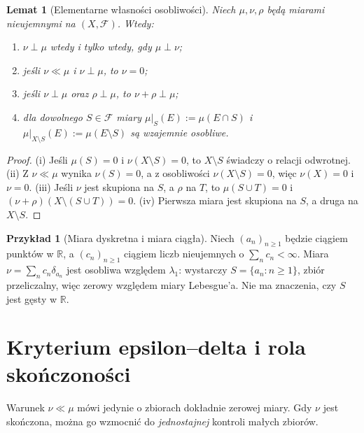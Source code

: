 \documentclass[11pt,a4paper,oneside]{book}
\numberwithin{equation}{chapter}
\theoremstyle{plain}
\newtheorem{lemat}[twierdzenie]{Lemat}
\theoremstyle{definition}
\newtheorem{przyklad}[twierdzenie]{Przykład}
\theoremstyle{remark}
\begin{document}
\begin{lemat}[Elementarne własności osobliwości]
\label{lem:singularity-17}
Niech $\mu,\nu,\rho$ będą miarami nieujemnymi na $(X,\mathcal F)$.
Wtedy:
\begin{enumerate}[label=\textup{(\roman*)}]
\item $\nu\perp\mu$ wtedy i tylko wtedy, gdy $\mu\perp\nu$;
\item jeśli $\nu\ll\mu$ i $\nu\perp\mu$, to $\nu=0$;
\item jeśli $\nu\perp\mu$ oraz $\rho\perp\mu$, to
$\nu+\rho\perp\mu$;
\item dla dowolnego $S\in\mathcal F$ miary
$\mu|_S(E):=\mu(E\cap S)$ i
$\mu|_{X\setminus S}(E):=\mu(E\setminus S)$ są wzajemnie osobliwe.
\end{enumerate}
\end{lemat}
\begin{proof}
(i) Jeśli $\mu(S)=0$ i $\nu(X\setminus S)=0$, to
$X\setminus S$ świadczy o relacji odwrotnej.
(ii) Z $\nu\ll\mu$ wynika $\nu(S)=0$, a z osobliwości
$\nu(X\setminus S)=0$, więc $\nu(X)=0$ i $\nu=0$.
(iii) Jeśli $\nu$ jest skupiona na $S$, a $\rho$ na $T$,
to $\mu(S\cup T)=0$ i $(\nu+\rho)(X\setminus(S\cup T))=0$.
(iv) Pierwsza miara jest skupiona na $S$, a druga na $X\setminus S$.
\end{proof}

\begin{przyklad}[Miara dyskretna i miara ciągła]
Niech $(a_n)_{n\ge1}$ będzie ciągiem punktów w $\mathbb R$, a
$(c_n)_{n\ge1}$ ciągiem liczb nieujemnych o
$\sum_nc_n<\infty$. Miara $\nu=\sum_nc_n\delta_{a_n}$
jest osobliwa względem $\lambda_1$: wystarczy
$S=\{a_n:n\ge1\}$, zbiór przeliczalny, więc zerowy
względem miary Lebesgue'a. Nie ma znaczenia, czy $S$ jest
gęsty w $\mathbb R$.
\end{przyklad}

\section{Kryterium epsilon--delta i rola skończoności}
Warunek $\nu\ll\mu$ mówi jedynie o zbiorach dokładnie zerowej
miary. Gdy $\nu$ jest skończona, można go wzmocnić do
\emph{jednostajnej} kontroli małych zbiorów.
\end{document}

